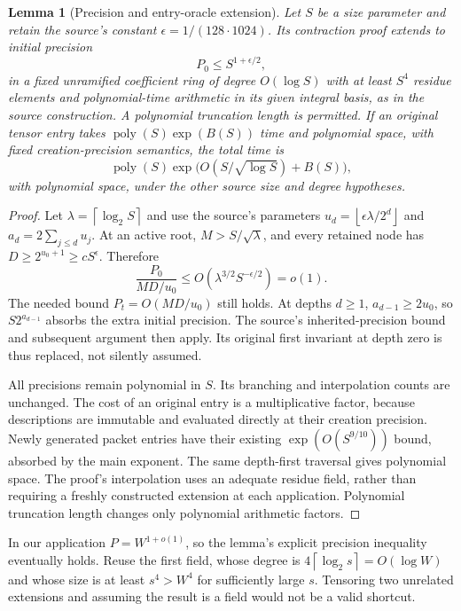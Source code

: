 \documentclass[11pt]{article}
\newtheorem{lemma}[theorem]{Lemma}
\theoremstyle{definition}
\theoremstyle{remark}
\newcommand{\poly}{\operatorname{poly}}
\newcommand{\ceil}[1]{\left\lceil #1\right\rceil}
\newcommand{\floor}[1]{\left\lfloor #1\right\rfloor}
\begin{document}
\begin{lemma}[Precision and entry-oracle extension]\label{lem:extension}
Let $S$ be a size parameter and retain the source's constant
$\epsilon=1/(128\cdot1024)$. Its contraction proof extends to initial
precision
\[
 P_0\le S^{1+\epsilon/2},
\]
in a fixed unramified coefficient ring of degree $O(\log S)$ with at least
$S^4$ residue elements and polynomial-time arithmetic in its given integral
basis, as in the source construction. A polynomial truncation length is permitted. If an
original tensor entry takes $\poly(S)\exp(B(S))$ time and polynomial
space, with fixed creation-precision semantics, the total time is
\[
 \poly(S)\exp\bigl(O(S/\sqrt{\log S})+B(S)\bigr),
\]
with polynomial space, under the other source size and degree hypotheses.
\end{lemma}
\begin{proof}
Let $\lambda=\ceil{\log_2S}$ and use the source's parameters
$u_d=\floor{\epsilon\lambda/2^d}$ and
$a_d=2\sum_{j\le d}u_j$. At an active root,
$M>S/\sqrt\lambda$, and every retained node has
$D\ge2^{u_0+1}\ge cS^\epsilon$. Therefore
\[
 \frac{P_0}{MD/u_0}
 \le O(\lambda^{3/2}S^{-\epsilon/2})=o(1).
\]
The needed bound $P_t=O(MD/u_0)$ still holds. At depths $d\ge1$,
$a_{d-1}\ge2u_0$, so $S2^{a_{d-1}}$ absorbs the extra initial
precision. The source's inherited-precision bound and subsequent argument
then apply. Its original first invariant at depth zero is thus replaced,
not silently assumed.

All precisions remain polynomial in $S$. Its branching and interpolation
counts are unchanged. The cost of an original entry is a multiplicative
factor, because descriptions are immutable and evaluated directly at their
creation precision. Newly generated packet entries have their existing
$\exp(O(S^{9/10}))$ bound, absorbed by the main exponent. The same
depth-first traversal gives polynomial space. The proof's interpolation uses
an adequate residue field, rather than requiring a freshly constructed
extension at each application. Polynomial truncation length changes only
polynomial arithmetic factors.
\end{proof}

In our application $P=W^{1+o(1)}$, so the lemma's explicit precision
inequality eventually holds. Reuse the first field, whose degree is
$4\ceil{\log_2s}=O(\log W)$ and whose size is at least $s^4>W^4$
for sufficiently large $s$. Tensoring two unrelated extensions and assuming
the result is a field would not be a valid shortcut.
\end{document}
